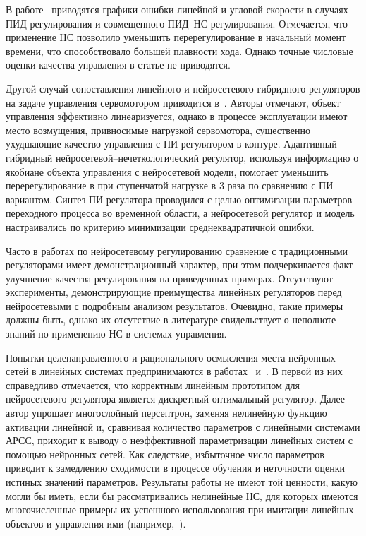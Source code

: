 В работе~\cite{boquete99} приводятся графики ошибки линейной и угловой
скорости в случаях ПИД регулирования и совмещенного ПИД--НС
регулирования.  Отмечается, что применение НС позволило уменьшить
перерегулирование в начальный момент времени, что способствовало
большей плавности хода.  Однако точные числовые оценки качества
управления в статье не приводятся.

Другой случай сопоставления линейного и нейросетевого гибридного
регуляторов на задаче управления сервомотором приводится
в~\cite{wailinlin00}.  Авторы отмечают, объект управления эффективно
линеаризуется, однако в процессе эксплуатации имеют место возмущения,
привносимые нагрузкой сервомотора, существенно ухудшающие качество
управления с ПИ регулятором в контуре.  Адаптивный гибридный
нейросетевой--не\-чет\-ко\-ло\-ги\-че\-ский регулятор, используя информацию о
якобиане объекта управления с нейросетевой модели, помогает уменьшить
перерегулирование в при ступенчатой нагрузке в 3 раза по сравнению с
ПИ вариантом.  Синтез ПИ регулятора проводился с целью оптимизации
параметров переходного процесса во временной области, а нейросетевой
регулятор и модель настраивались по критерию минимизации
среднеквадратичной ошибки.

Часто в работах по нейросетевому регулированию сравнение с
традиционными регуляторами имеет демонстрационный характер, при этом
подчеркивается факт улучшение качества регулирования на приведенных
примерах.  Отсутствуют эксперименты, демонстрирующие преимущества
линейных регуляторов перед нейросетевыми с подробным анализом
результатов.  Очевидно, такие примеры должны быть, однако их
отсутствие в литературе свидельствует о неполноте знаний по применению
НС в системах управления.

Попытки целенаправленного и рационального осмысления места нейронных
сетей в линейных системах предпринимаются в работах~\cite{warwick96}
и~\cite{toudeft}.  В первой из них справедливо отмечается, что
корректным линейным прототипом для нейросетевого регулятора является
дискретный оптимальный регулятор.  Далее автор упрощает многослойный
персептрон, заменяя нелинейную функцию активации линейной и, сравнивая
количество параметров с линейными системами АРСС, приходит к выводу о
неэффективной параметризации линейных систем с помощью нейронных
сетей.  Как следствие, избыточное число параметров приводит к
замедлению сходимости в процессе обучения и неточности оценки истиных
значений параметров.  Результаты работы не имеют той ценности, какую
могли бы иметь, если бы рассматривались нелинейные НС, для которых
имеются многочисленные примеры их успешного использования при имитации
линейных объектов и управления ими
(например,~\cite{khomyu96}\cite{wailinlin00}\cite{elfil-pta99}).

